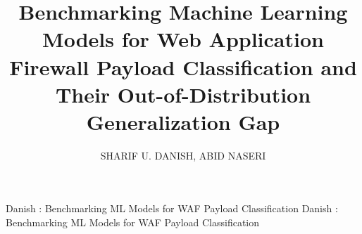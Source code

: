 \documentclass{ieeeaccess}
\begin{document}

\title{Benchmarking Machine Learning Models for Web Application Firewall
Payload Classification and Their Out-of-Distribution Generalization Gap}

\author{\uppercase{Sharif U. Danish},
\uppercase{Abid Naseri}}
\address[1]{King's College London, London, United Kingdom (e-mail: sharifdanish75@outlook.com)}
\address[2]{AFFILIATION NEEDED HERE (e-mail: abidnasiri90@gmail.com)}

\markboth
{Danish \headeretal: Benchmarking ML Models for WAF Payload Classification}
{Danish \headeretal: Benchmarking ML Models for WAF Payload Classification}

\end{document}
